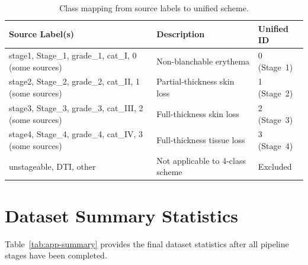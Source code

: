 \documentclass[a4paper,12pt,twoside]{report}
\begin{document}
\begin{table}[htbp]
  \centering
  \caption{Class mapping from source labels to unified scheme.}
  \label{tab:app-class-map}
  \begin{tabularx}{\textwidth}{lXl}
    \toprule
    \textbf{Source Label(s)} & \textbf{Description} & \textbf{Unified ID} \\
    \midrule
    stage1, Stage\_1, grade\_1, cat\_I, 0 (some sources)
      & Non-blanchable erythema & 0 (Stage~1) \\
    stage2, Stage\_2, grade\_2, cat\_II, 1 (some sources)
      & Partial-thickness skin loss & 1 (Stage~2) \\
    stage3, Stage\_3, grade\_3, cat\_III, 2 (some sources)
      & Full-thickness skin loss & 2 (Stage~3) \\
    stage4, Stage\_4, grade\_4, cat\_IV, 3 (some sources)
      & Full-thickness tissue loss & 3 (Stage~4) \\
    unstageable, DTI, other
      & Not applicable to 4-class scheme & Excluded \\
    \bottomrule
  \end{tabularx}
\end{table}

\chapter{Dataset Summary Statistics}
\label{app:dataset-summary}

Table~\ref{tab:app-summary} provides the final dataset statistics after all
pipeline stages have been completed.
\end{document}
